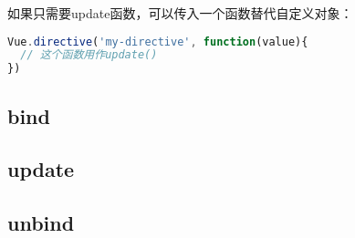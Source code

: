 如果只需要update函数，可以传入一个函数替代自定义对象：


\begin{lstlisting}[language=JavaScript]
Vue.directive('my-directive', function(value){
  // 这个函数用作update()
})
\end{lstlisting}

\subsection{bind}





\subsection{update}


\subsection{unbind}



\begin{lstlisting}[language=JavaScript]

\end{lstlisting}




\begin{lstlisting}[language=JavaScript]

\end{lstlisting}




\begin{lstlisting}[language=JavaScript]

\end{lstlisting}




\begin{lstlisting}[language=JavaScript]

\end{lstlisting}




\begin{lstlisting}[language=JavaScript]

\end{lstlisting}